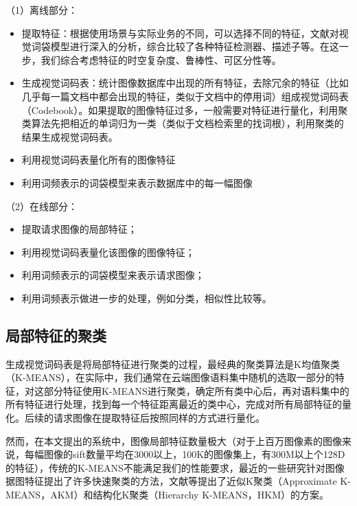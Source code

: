（1）离线部分：
\begin{itemize}
\item 提取特征：根据使用场景与实际业务的不同，可以选择不同的特征，文献\cite{Zhang:2006ej}对视觉词袋模型进行深入的分析，综合比较了各种特征检测器、描述子等。在这一步，我们综合考虑特征的时空复杂度、鲁棒性、可区分性等。
\item 生成视觉词码表：统计图像数据库中出现的所有特征，去除冗余的特征（比如几乎每一篇文档中都会出现的特征，类似于文档中的停用词）组成视觉词码表（Codebook）。如果提取的图像特征过多，一般需要对特征进行量化，利用聚类算法先把相近的单词归为一类（类似于文档检索里的找词根），利用聚类的结果生成视觉词码表。
\item 利用视觉词码表量化所有的图像特征
\item 利用词频表示的词袋模型来表示数据库中的每一幅图像
\end{itemize}

（2）在线部分：
\begin{itemize}
\item 提取请求图像的局部特征；
\item 利用视觉词码表量化该图像的图像特征；
\item 利用词频表示的词袋模型来表示请求图像；
\item 利用词频表示做进一步的处理，例如分类，相似性比较等。
\end{itemize}


\subsection{局部特征的聚类}
生成视觉词码表是将局部特征进行聚类的过程，最经典的聚类算法是K均值聚类（K-MEANS），在实际中，我们通常在云端图像语料集中随机的选取一部分的特征，对这部分特征使用K-MEANS进行聚类，确定所有类中心后，再对语料集中的所有特征进行处理，找到每一个特征距离最近的类中心，完成对所有局部特征的量化。后续的请求图像在提取特征后按照同样的方式进行量化。

然而，在本文提出的系统中，图像局部特征数量极大（对于上百万图像素的图像来说，每幅图像的sift数量平均在3000以上，100K的图像集上，有300M以上个128D的特征），传统的K-MEANS不能满足我们的性能要求，最近的一些研究针对图像据图特征提出了许多快速聚类的方法，文献\cite{Philbin:2007fk,Muja:2009uv,Wang:2010vs}等提出了近似K聚类（Approximate K-MEANS，AKM）和结构化K聚类（Hierarchy K-MEANS，HKM）的方案。

